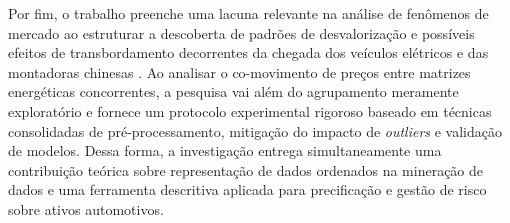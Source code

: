 Por fim, o trabalho preenche uma lacuna relevante na análise de fenômenos de mercado ao estruturar a descoberta de padrões de desvalorização e possíveis efeitos de transbordamento decorrentes da chegada dos veículos elétricos e das montadoras chinesas \cite{li2025rise, abrardi2026market}. Ao analisar o co-movimento de preços entre matrizes energéticas concorrentes, a pesquisa vai além do agrupamento meramente exploratório e fornece um protocolo experimental rigoroso baseado em técnicas consolidadas de pré-processamento, mitigação do impacto de \textit{outliers} e validação de modelos. Dessa forma, a investigação entrega simultaneamente uma contribuição teórica sobre representação de dados ordenados na mineração de dados e uma ferramenta descritiva aplicada para precificação e gestão de risco sobre ativos automotivos.
